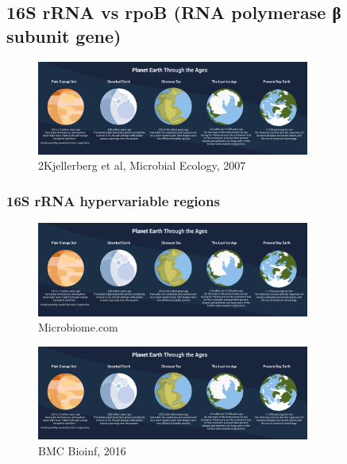 \documentclass[
]{book}
\begin{document}
\hypertarget{s-rrna-vs-rpob-rna-polymerase-ux3b2-subunit-gene}{%
\subsection{16S rRNA vs rpoB (RNA polymerase β subunit gene)}\label{s-rrna-vs-rpob-rna-polymerase-ux3b2-subunit-gene}}

\begin{figure}
\centering
\includegraphics[width=0.8\textwidth,height=\textheight]{./Figures/Planets.png}
\caption{2Kjellerberg et al, Microbial Ecology, 2007}
\end{figure}

\hypertarget{s-rrna-hypervariable-regions}{%
\subsubsection{16S rRNA hypervariable regions}\label{s-rrna-hypervariable-regions}}

\begin{figure}
\centering
\includegraphics[width=0.8\textwidth,height=\textheight]{./Figures/Planets.png}
\caption{Microbiome.com}
\end{figure}

\begin{figure}
\centering
\includegraphics[width=0.8\textwidth,height=\textheight]{./Figures/Planets.png}
\caption{BMC Bioinf, 2016}
\end{figure}
\end{document}
